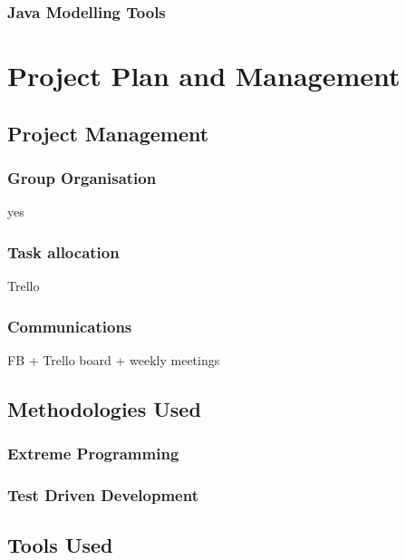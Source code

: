\documentclass[a4paper]{article}
\begin{document}
\subsubsection{Java Modelling Tools}

\section{Project Plan and Management}

\subsection{Project Management}%

\subsubsection{Group Organisation}

yes

\subsubsection{Task allocation}

Trello

\subsubsection{Communications}

FB + Trello board + weekly meetings

\subsection{Methodologies Used}%

\subsubsection{Extreme Programming}

\subsubsection{Test Driven Development}

\subsection{Tools Used}%
\end{document}
